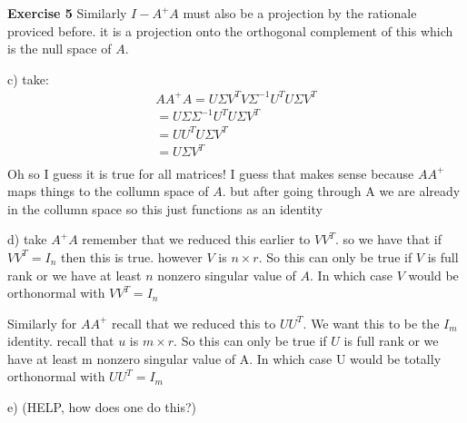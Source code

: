 \documentclass[12pt]{article}
\newenvironment{exercise}[1]{\vspace{.1in}\noindent\textbf{Exercise #1 \hspace{.05em}}}{}
\theoremstyle{definition}
\theoremstyle{remark}
\begin{document}
\begin{exercise}{5}
	Similarly $I-A^+A$ must also be a projection by the rationale proviced before. it is a projection onto the orthogonal complement of this which is the null space of $A$.

	c) take:
	\begin{align}
		AA^+A=U\Sigma V^TV\Sigma^{-1}U^TU\Sigma V^T \\
		=U\Sigma \Sigma^{-1}U^TU\Sigma V^T          \\
		=UU^TU\Sigma V^T                            \\
		=U\Sigma V^T                                \\
	\end{align}
	Oh so I guess it is true for all matrices! I guess that makes sense because $AA^+$ maps things to the collumn space of $A$. but after going through A we are already in the collumn space so this just functions as an identity

	d) take $A^+A$ remember that we reduced this earlier to $VV^T$. so we have that if $VV^T=I_n$ then this is true. however $V$ is $n\times r$. So this can only be true if $V$ is full rank or we have at least $n$ nonzero singular value of $A$. In which case $V$ would be orthonormal with $VV^T=I_n$

	Similarly for $AA^+$ recall that we reduced this to $UU^T$. We want this to be the $I_m$ identity. recall that $u$ is $m\times r$. So this can only be true if $U$ is full rank or we have at least m nonzero singular value of A. In which case U would be totally orthonormal with $UU^T=I_m$

	e) (HELP, how does one do this?)

\end{exercise}
\end{document}
